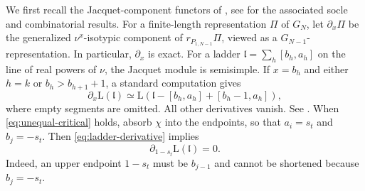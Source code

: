 \documentclass[10pt,a4paper]{article}
\theoremstyle{definition}
\theoremstyle{remark}
\numberwithin{equation}{section}
\newcommand{\fl}{\mathfrak{l}}
\newcommand{\Lrep}{\mathrm{L}}
\begin{document}
We first recall the Jacquet-component functors of
\cite[\S3]{Minguez2009}, see \cite[\S\S5--6]{Minguez2009}
for the associated socle and combinatorial results. For a finite-length
representation $\Pi$ of $G_N$, let $\partial_x\Pi$ be the generalized
$\nu^x$-isotypic component of $r_{P_{1,N-1}}\Pi$, viewed as a
$G_{N-1}$-representation. In particular, $\partial_x$ is exact.
For a ladder $\fl=\sum_h[b_h,a_h]$ on the line of real powers of
$\nu$, the Jacquet module is semisimple. If $x=b_h$
and either $h=k$ or $b_h>b_{h+1}+1$, a standard computation gives
\begin{equation}\label{eq:ladder-derivative}
 \partial_x\Lrep(\fl)\simeq
 \Lrep(\fl-[b_h,a_h]+[b_h-1,a_h]),
\end{equation}
where empty segments are omitted. All other derivatives vanish. See
\cite[Theorem~2.1 and Corollary~2.2]{KL2012}.
When \eqref{eq:unequal-critical} holds, absorb $\chi$ into the
endpoints, so that $a_i=s_t$ and $b_j=-s_t$. Then
\eqref{eq:ladder-derivative} implies
\begin{equation}\label{eq:exceptional-derivative-zero}
 \partial_{1-s_t}\Lrep(\fl)=0.
\end{equation}
Indeed, an upper endpoint $1-s_t$ must be $b_{j-1}$ and cannot be shortened because
$b_j=-s_t$.
\end{document}
